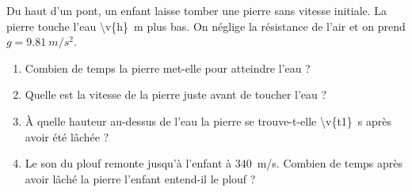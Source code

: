 Du haut d'un pont, un enfant laisse tomber une pierre sans vitesse initiale. La pierre touche l'eau \qty{\v{h}}{m} plus bas. On néglige la résistance de l'air et on prend $g = \qty{9.81}{m/s^2}$.

\begin{enumerate}[label=\alph*)]
    \item Combien de temps la pierre met-elle pour atteindre l'eau ?
    \item Quelle est la vitesse de la pierre juste avant de toucher l'eau ?
    \item À quelle hauteur au-dessus de l'eau la pierre se trouve-t-elle \qty{\v{t1}}{s} après avoir été lâchée ?
    \item Le son du plouf remonte jusqu'à l'enfant à \qty{340}{m/s}. Combien de temps après avoir lâché la pierre l'enfant entend-il le plouf ?
\end{enumerate}
